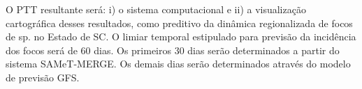\indent O \acrshort{PTT} resultante será: i) o sistema computacional e ii) a visualização cartográfica desses resultados, como preditivo da dinâmica regionalizada de focos de  sp. no Estado de \acrlong{SC}. O limiar temporal estipulado para previsão da incidência dos focos será de 60 dias. Os primeiros 30 dias serão determinados a partir do sistema \acrshort{SAMeT}-\acrshort{MERGE}. Os demais dias serão determinados através do modelo de previsão \acrshort{GFS}.










